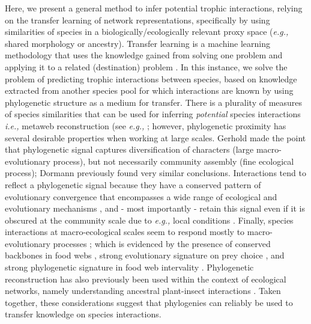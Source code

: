 Here, we present a general method to infer potential trophic
interactions, relying on the transfer learning of network
representations, specifically by using similarities of species in a
biologically/ecologically relevant proxy space (\emph{e.g.,} shared
morphology or ancestry). Transfer learning is a machine learning
methodology that uses the knowledge gained from solving one problem and
applying it to a related (destination) problem \cite{Torrey2010TraLea,
Pan2010SurTra}. In this instance, we solve the problem of predicting
trophic interactions between species, based on knowledge extracted from
another species pool for which interactions are known by using
phylogenetic structure as a medium for transfer. There is a plurality of
measures of species similarities that can be used for inferring
\emph{potential} species interactions \emph{i.e.,} metaweb reconstruction
(see \emph{e.g.,} \cite{Morales-Castilla2015InfBio}; however, phylogenetic
proximity has several desirable properties when working at large scales.
Gerhold \cite{Gerhold2015PhyPat} made the point that phylogenetic signal captures
diversification of characters (large macro-evolutionary process), but
not necessarily community assembly (fine ecological process);
Dormann \cite{Dormann2010EvoCli} previously found very similar conclusions.
Interactions tend to reflect a phylogenetic signal because they have a
conserved pattern of evolutionary convergence that encompasses a wide
range of ecological and evolutionary mechanisms \cite{Mouquet2012EcoAdv,
Cavender-Bares2009MerCom}, and - most importantly - retain this
signal even if it is obscured at the community scale due to \emph{e.g.,}
local conditions \cite{Poisot2018IntRet, Hutchinson2017CopSig}.
Finally, species interactions at macro-ecological scales seem to respond
mostly to macro-evolutionary processes \cite{Price2003MacThe}; which is
evidenced by the presence of conserved backbones in food webs
\cite{BramonMora2018IdeCom, DallaRiva2016ExpEvo}, strong evolutionary
signature on prey choice \cite{Stouffer2012EvoCon}, and strong
phylogenetic signature in food web intervality \cite{Eklof2016PhyCom}.
Phylogenetic reconstruction has also previously been used within the
context of ecological networks, namely understanding ancestral
plant-insect interactions \cite{Braga2021PhyRec}. Taken together, these
considerations suggest that phylogenies can reliably be used to transfer
knowledge on species interactions.

